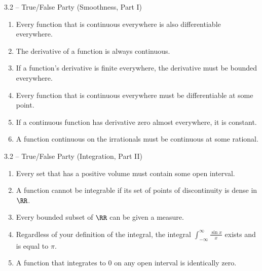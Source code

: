\documentclass{beamer}
\theoremstyle{plain}
\begin{document}
\begin{frame}{3.2 -- True/False Party (Smoothness, Part I)}
  \begin{enumerate}
\item Every function that is continuous everywhere is also differentiable
    everywhere. 
   
  \item The derivative of a function is always continuous.
    
  \item If a function's derivative is finite everywhere, the derivative
    must be bounded everywhere. 
  
  \item Every function that is continuous everywhere must be differentiable at
    some point. 

  \item If a continuous function has derivative zero almost everywhere, it is
    constant. 
  
  \item A function continuous on the irrationals must be continuous at some
    rational.
 \end{enumerate} 
\end{frame}

\begin{frame}{3.2 -- True/False Party (Integration, Part II)}
  \begin{enumerate}
    \item Every set that has a positive volume must contain some open interval.

\item A function cannot be integrable if its set of points of discontinuity is
  dense in $\RR$. 

\item Every bounded subset of $\RR$ can be given a measure.  
  
\item Regardless of your definition of the integral, the integral $\int_{-\infty}^\infty \frac{\sin x}{x}$ exists and is equal to
    $\pi$.  

\item A function that integrates to 0 on any open interval is identically zero.
 \end{enumerate} 
\end{frame}
\end{document}
